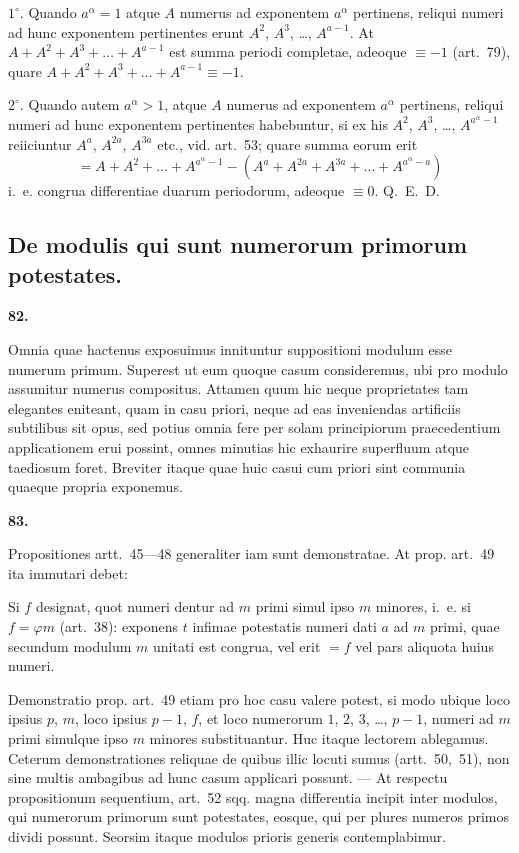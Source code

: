 \documentclass[12pt,a4paper]{article}
\theoremstyle{plain}
\theoremstyle{definition}
\theoremstyle{remark}
\begin{document}
$1^\circ$. Quando $a^\alpha=1$ atque $A$ numerus ad exponentem $a^\alpha$ pertinens, reliqui numeri ad hunc exponentem pertinentes erunt $A^2$, $A^3$, \ldots, $A^{a-1}$. At $A+A^2+A^3+\ldots+A^{a-1}$ est summa periodi completae, adeoque $\equiv -1$ (art.~79), quare $A+A^2+A^3+\ldots+A^{a-1} \equiv -1$.

$2^\circ$. Quando autem $a^\alpha > 1$, atque $A$ numerus ad exponentem $a^\alpha$ pertinens, reliqui numeri ad hunc exponentem pertinentes habebuntur, si ex his $A^2$, $A^3$, \ldots, $A^{a^\alpha-1}$ reiiciuntur $A^a$, $A^{2a}$, $A^{3a}$ etc., vid. art.~53; quare summa eorum erit
\[= A+A^2+\ldots+A^{a^\alpha-1} - (A^a+A^{2a}+A^{3a}+\ldots+A^{a^\alpha-a})\]
i.~e. congrua differentiae duarum periodorum, adeoque $\equiv 0$. Q.~E.~D.


\subsection*{De modulis qui sunt numerorum primorum potestates.}

\setcounter{satz}{82}
\addtocounter{satz}{-1}
\textbf{82.}

Omnia quae hactenus exposuimus innituntur suppositioni modulum esse numerum primum. Superest ut eum quoque casum consideremus, ubi pro modulo assumitur numerus compositus. Attamen quum hic neque proprietates tam elegantes eniteant, quam in casu priori, neque ad eas inveniendas artificiis subtilibus sit opus, sed potius omnia fere per solam principiorum praecedentium applicationem erui possint, omnes minutias hic exhaurire superfluum atque taediosum foret. Breviter itaque quae huic casui cum priori sint communia quaeque propria exponemus.

\setcounter{satz}{83}
\addtocounter{satz}{-1}
\textbf{83.}

Propositiones artt.~45---48 generaliter iam sunt demonstratae. At prop. art.~49 ita immutari debet:

Si $f$ designat, quot numeri dentur ad $m$ primi simul ipso $m$ minores, i.~e. si $f = \varphi m$ (art.~38): exponens $t$ infimae potestatis numeri dati $a$ ad $m$ primi, quae secundum modulum $m$ unitati est congrua, vel erit $=f$ vel pars aliquota huius numeri.

Demonstratio prop. art.~49 etiam pro hoc casu valere potest, si modo ubique loco ipsius $p$, $m$, loco ipsius $p-1$, $f$, et loco numerorum $1$, $2$, $3$, \ldots, $p-1$, numeri ad $m$ primi simulque ipso $m$ minores substituantur. Huc itaque lectorem ablegamus. Ceterum demonstrationes reliquae de quibus illic locuti sumus (artt.~50,~51), non sine multis ambagibus ad hunc casum applicari possunt. --- At respectu propositionum sequentium, art.~52 sqq. magna differentia incipit inter modulos, qui numerorum primorum sunt potestates, eosque, qui per plures numeros primos dividi possunt. Seorsim itaque modulos prioris generis contemplabimur.
\end{document}
